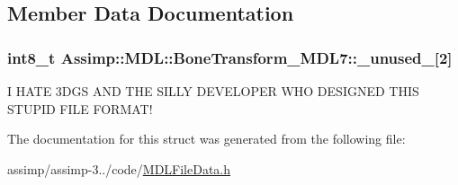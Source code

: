\subsection{Member Data Documentation}
\hypertarget{struct_assimp_1_1_m_d_l_1_1_bone_transform___m_d_l7_a884f237263bf3cf6dbcb487b0385b6db}{
\subsubsection[{\+\_\+unused\+\_\+}]{\setlength{\rightskip}{0pt plus 5cm}int8\+\_\+t Assimp\+::\+M\+D\+L\+::\+Bone\+Transform\+\_\+\+M\+D\+L7\+::\+\_\+unused\+\_\+\mbox{[}2\mbox{]}}}\label{struct_assimp_1_1_m_d_l_1_1_bone_transform___m_d_l7_a884f237263bf3cf6dbcb487b0385b6db}
I H\+A\+T\+E 3\+D\+G\+S A\+N\+D T\+H\+E S\+I\+L\+L\+Y D\+E\+V\+E\+L\+O\+P\+E\+R W\+H\+O D\+E\+S\+I\+G\+N\+E\+D T\+H\+I\+S S\+T\+U\+P\+I\+D F\+I\+L\+E F\+O\+R\+M\+A\+T! 

The documentation for this struct was generated from the following file\+:\begin{DoxyCompactItemize}
\item 
assimp/assimp-\/3../code/\hyperlink{_m_d_l_file_data_8h}{M\+D\+L\+File\+Data.\+h}\end{DoxyCompactItemize}
